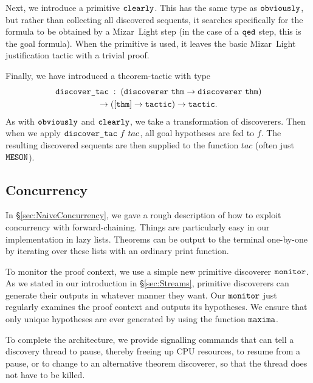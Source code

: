 Next, we introduce a primitive $\texttt{clearly}$. This has the same type as $\texttt{obviously}$, but rather than collecting all discovered sequents, it searches specifically for the formula to be obtained by a Mizar~Light step (in the case of a $\texttt{qed}$ step, this is the goal formula). When the  primitive is used, it leaves the basic Mizar~Light justification tactic with a trivial proof.

\label{sec:DiscoverTac}
Finally, we have introduced a theorem-tactic  with type
\begin{multline*}
\code{discover\_tac}\;:\;(\code{discoverer}\ \code{thm}\rightarrow\code{discoverer} \ \code{thm}) \\\rightarrow ([\code{thm}] \rightarrow \code{tactic}) \rightarrow \code{tactic}.
\end{multline*}
As with $\texttt{obviously}$ and $\texttt{clearly}$, we take a transformation of discoverers. Then when we apply $\texttt{discover\_tac}\ f\ tac$,  all goal hypotheses are fed to $f$. The resulting discovered sequents are then supplied to the function $tac$ (often just $\texttt{MESON}$).

\subsection{Concurrency}
In \S\ref{sec:NaiveConcurrency}, we gave a rough description of how to exploit concurrency with forward-chaining. Things are particularly easy in our implementation in lazy lists. Theorems can be output to the terminal one-by-one by iterating over these lists with an ordinary print function.

To monitor the proof context, we use a simple new primitive discoverer $\texttt{monitor}$. As we stated in our introduction in \S\ref{sec:Streams}, primitive discoverers can generate their outputs in whatever manner they want. Our $\texttt{monitor}$ just regularly examines the proof context and outputs its hypotheses. We ensure that only unique hypotheses are ever generated by using the function $\texttt{maxima}$.

To complete the architecture, we provide signalling commands that can tell a discovery thread to pause, thereby freeing up CPU resources, to resume from a pause, or to change to an alternative theorem discoverer, so that the thread does not have to be killed.


